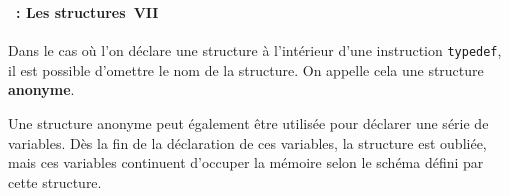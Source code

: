 \begin{frame}[containsverbatim]
  \frametitle{\secname}
  \framesubtitle{\subsecname~: Les structures~VII} 

  Dans le cas où l'on déclare une structure à l'intérieur d'une instruction \verb|typedef|, il est possible d'omettre
  le nom de la structure. On appelle cela une structure \textbf{anonyme}.
  \vspace{0.5cm}
  \par
  Une structure anonyme peut également être utilisée pour déclarer une série de variables. Dès la fin de la 
  déclaration de ces variables, la structure est oubliée, mais ces variables continuent d'occuper la mémoire selon
  le schéma défini par cette structure.
\end{frame}

